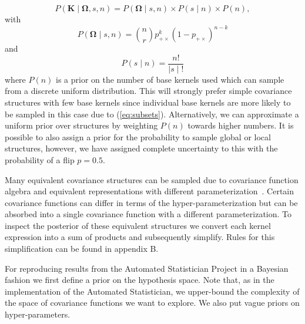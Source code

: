 \documentclass{article} %
\begin{document}
\begin{equation}
P(\mathbf{K} \mid \bm{\Omega},s,n) = P(\bm{\Omega} \mid s,n)\times P(s \mid n) \times P(n),
\end{equation}
with
\begin{equation}
P(\bm{\Omega} \mid s,n)= {n \choose r}  p_{+\times}^k (1 - p_{+\times})^{n-k}
\end{equation}
and
\begin{equation}
\label{eq:subsets}
P(s \mid n) = \frac{n!}{ \mid s \mid !}
\end{equation}
where $P(n)$ is a prior on the number of base kernels used which can sample from a discrete uniform distribution. This will strongly prefer simple covariance structures with few base kernels since individual base kernels are more likely to be sampled in this case due to (\ref{eq:subsets}). Alternatively, we can approximate a uniform prior over structures by weighting $P(n)$ towards higher numbers. It is possible to also assign a prior for the probability to sample global or local structures, however, we have assigned complete uncertainty to this with the probability of a flip $p = 0.5$.



Many equivalent covariance structures can be sampled due to covariance function algebra and equivalent representations with different parameterization~\citep{lloyd2014automatic}. Certain covariance functions can differ in terms of the hyper-parameterization but can be absorbed into a single covariance function with a different parameterization. To inspect the posterior of these equivalent structures we convert each kernel expression into a sum of products and subsequently simplify. Rules for this simplification can be found in appendix B.


For reproducing results from the Automated Statistician Project in a Bayesian fashion we first define a prior on the hypothesis space. Note that, as in the implementation of the Automated Statistician, we upper-bound the complexity of the space of covariance functions we want to explore. We also put vague priors on hyper-parameters.
\end{document}
